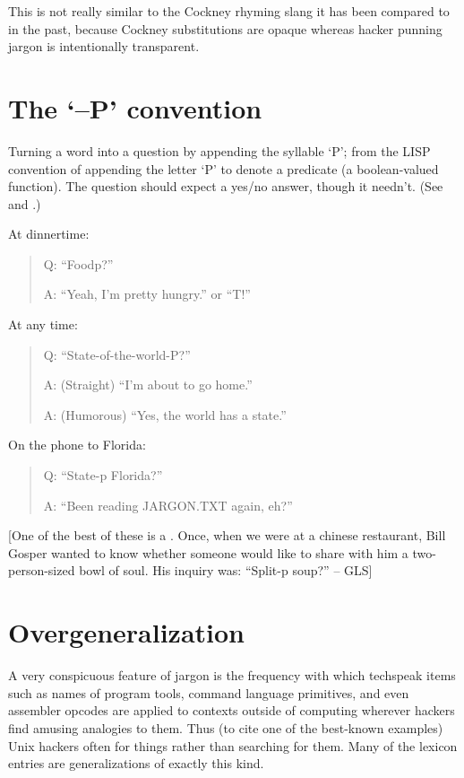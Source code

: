 	This is not really similar to the Cockney rhyming slang it has been
	compared to in the past, because Cockney substitutions are opaque whereas
	hacker punning jargon is intentionally transparent.


\section*{The `--P' convention}\label{The-P-convention}

	Turning a word into a question by appending the syllable `P'; from the LISP
	convention of appending the letter `P' to denote a predicate (a
	boolean-valued function). The question should expect a yes/no answer,
	though it needn't. (See  and .)

	At dinnertime:

	\begin{quote}
		Q: ``Foodp?''

		A: ``Yeah, I'm pretty hungry.'' or ``T!''
	\end{quote}

	At any time:

	\begin{quote}
		Q: ``State-of-the-world-P?''

		A: (Straight) ``I'm about to go home.''

		A: (Humorous) ``Yes, the world has a state.''
	\end{quote}

	On the phone to Florida:

	\begin{quote}
		Q: ``State-p Florida?''

		A: ``Been reading JARGON.TXT again, eh?''
	\end{quote}

	[One of the best of these is a . Once, when we were at
	a chinese restaurant, Bill Gosper wanted to know whether someone would like
	to share with him a two-person-sized bowl of soul. His inquiry was:
	``Split-p soup?'' -- GLS]

\section*{Overgeneralization}\label{Overgeneralization}

	A very conspicuous feature of jargon is the frequency with which techspeak
	items such as names of program tools, command language primitives, and even
	assembler opcodes are applied to contexts outside of computing wherever
	hackers find amusing analogies to them.  Thus (to cite one of the
	best-known examples) Unix hackers often  for things rather
	than searching for them. Many of the lexicon entries are generalizations of
	exactly this kind.

